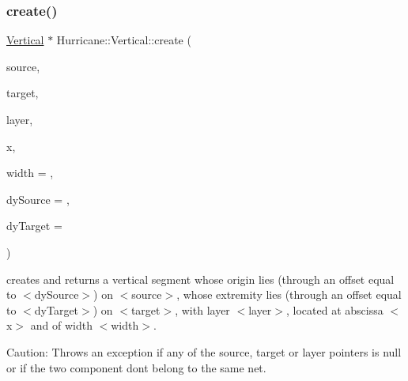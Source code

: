 \subsubsection{\texorpdfstring{create()}{create()}\hspace{0.1cm}{\footnotesize\ttfamily [2/2]}}
{\footnotesize\ttfamily \hyperlink{classHurricane_1_1Vertical}{Vertical} $\ast$ Hurricane\+::\+Vertical\+::create (\begin{DoxyParamCaption}\item[{\hyperlink{classHurricane_1_1Component}{Component} $\ast$}]{source,  }\item[{\hyperlink{classHurricane_1_1Component}{Component} $\ast$}]{target,  }\item[{const \hyperlink{classHurricane_1_1Layer}{Layer} $\ast$}]{layer,  }\item[{const \hyperlink{group__DbUGroup_ga4fbfa3e8c89347af76c9628ea06c4146}{Db\+U\+::\+Unit} \&}]{x,  }\item[{const \hyperlink{group__DbUGroup_ga4fbfa3e8c89347af76c9628ea06c4146}{Db\+U\+::\+Unit} \&}]{width = {},  }\item[{const \hyperlink{group__DbUGroup_ga4fbfa3e8c89347af76c9628ea06c4146}{Db\+U\+::\+Unit} \&}]{dy\+Source = {},  }\item[{const \hyperlink{group__DbUGroup_ga4fbfa3e8c89347af76c9628ea06c4146}{Db\+U\+::\+Unit} \&}]{dy\+Target = {} }\end{DoxyParamCaption})\hspace{0.3cm}{\ttfamily [static]}}

creates and returns a vertical segment whose origin lies (through an offset equal to {\ttfamily $<$dy\+Source$>$}) on {\ttfamily $<$source$>$}, whose extremity lies (through an offset equal to {\ttfamily $<$dy\+Target$>$}) on {\ttfamily $<$target$>$}, with layer {\ttfamily $<$layer$>$}, located at abscissa {\ttfamily $<$x$>$} and of width {\ttfamily $<$width$>$}.

\begin{DoxyParagraph}{Caution\+:}
Throws an exception if any of the source, target or layer pointers is null or if the two component don\textquotesingle{}t belong to the same net. 
\end{DoxyParagraph}
\mbox{\label{classHurricane_1_1Vertical_a798671c28c5e9848a92a6d1a9765e3ce}} 
